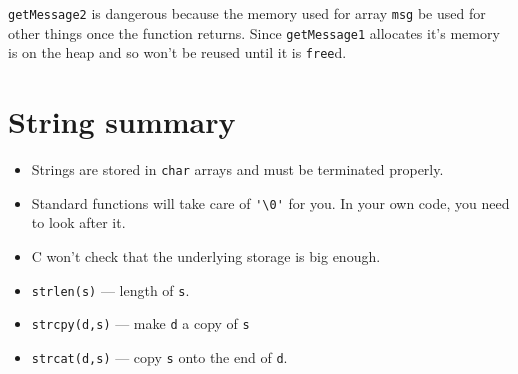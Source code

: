 \texttt{getMessage2} is dangerous because the memory used for array \texttt{msg} be used for other things once the function returns.
Since \texttt{getMessage1} allocates it's memory is on the heap and so won't be reused until it is \texttt{free}d.

\section*{String summary}
\begin{itemize}
 \item Strings are stored in \texttt{char} arrays and must be terminated properly.
 \item Standard functions will take care of \lstinline!'\0'! for you. In your own code, you need to look after it.
 \item C won't check that the underlying storage is big enough.
 \item \texttt{strlen(s)} --- length of \texttt{s}.
 \item \texttt{strcpy(d,s)} --- make \texttt{d} a copy of \texttt{s}
 \item \texttt{strcat(d,s)} --- copy \texttt{s} onto the end of \texttt{d}.
\end{itemize}
